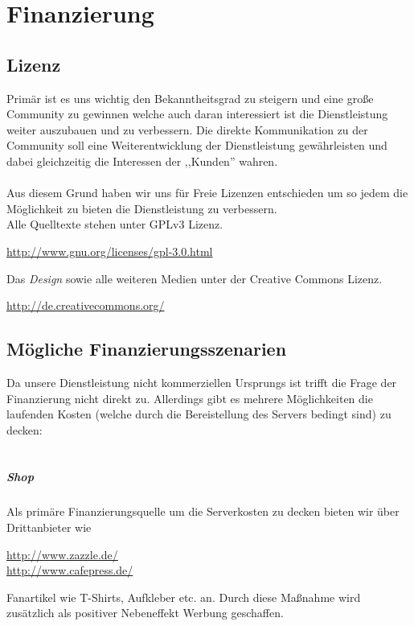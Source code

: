 \chapter{Finanzierung}

\section{Lizenz}
Primär ist es uns wichtig den Bekanntheitsgrad zu steigern und eine große
Community zu gewinnen welche auch daran interessiert ist die Dienstleistung
weiter auszubauen und zu verbessern. Die direkte Kommunikation zu der Community
soll eine Weiterentwicklung der Dienstleistung gewährleisten und dabei
gleichzeitig die Interessen der ,,Kunden'' wahren.
\\
\\
Aus diesem Grund haben wir uns für Freie Lizenzen entschieden um so jedem die
Möglichkeit zu bieten die Dienstleistung zu verbessern.
\\
Alle Quelltexte stehen unter GPLv3 Lizenz.
\begin{center}
\url{http://www.gnu.org/licenses/gpl-3.0.html}
\end{center}
Das \emph{Design} sowie alle weiteren
Medien unter der Creative Commons Lizenz.
\begin{center}
\url{http://de.creativecommons.org/ }
\end{center}

\section{Mögliche Finanzierungsszenarien}
Da unsere Dienstleistung nicht kommerziellen Ursprungs ist trifft die Frage
der Finanzierung nicht direkt zu. Allerdings gibt es mehrere Möglichkeiten 
die laufenden Kosten (welche durch die Bereistellung des Servers bedingt sind)
zu decken:
\\
\\
\paragraph{Shop} Als primäre Finanzierungsquelle um die Serverkosten zu decken bieten wir über
Drittanbieter wie 
\begin{center}
 \url{http://www.zazzle.de/} 
 \\
 \url{http://www.cafepress.de/}
\end{center}
Fanartikel wie T-Shirts, Aufkleber etc. an. Durch diese Maßnahme wird zusätzlich
als positiver Nebeneffekt Werbung geschaffen.
\\
